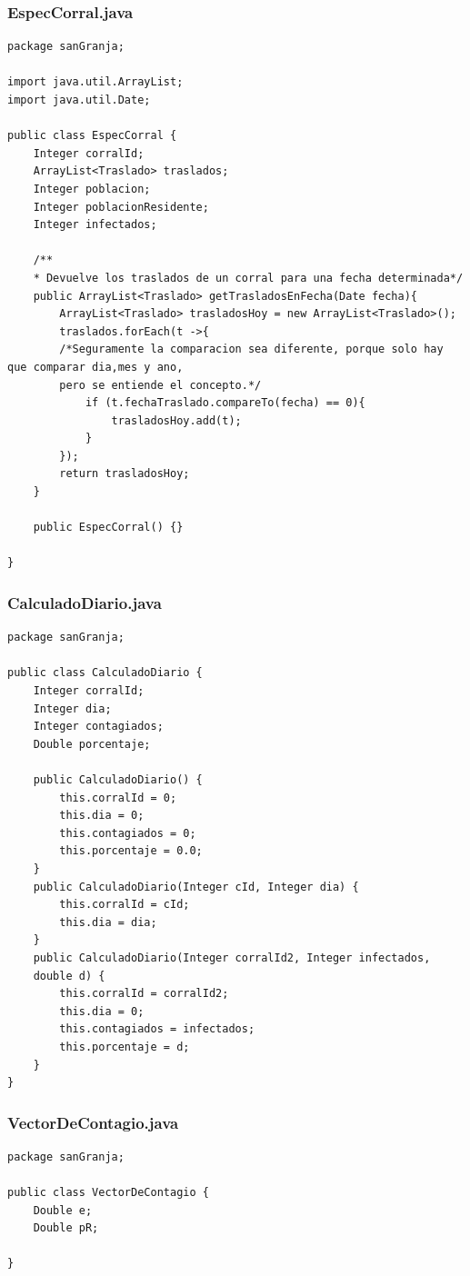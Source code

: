 \documentclass[a4paper]{article}
\begin{document}
\subsubsection{EspecCorral.java}
\begin{lstlisting}
package sanGranja;

import java.util.ArrayList;
import java.util.Date;

public class EspecCorral {
	Integer corralId;
	ArrayList<Traslado> traslados;
	Integer poblacion;
	Integer poblacionResidente;
	Integer infectados;
	
	/**
	* Devuelve los traslados de un corral para una fecha determinada*/
	public ArrayList<Traslado> getTrasladosEnFecha(Date fecha){
		ArrayList<Traslado> trasladosHoy = new ArrayList<Traslado>(); 
		traslados.forEach(t ->{
		/*Seguramente la comparacion sea diferente, porque solo hay que comparar dia,mes y ano, 
		pero se entiende el concepto.*/
			if (t.fechaTraslado.compareTo(fecha) == 0){
				trasladosHoy.add(t);
			}
		});
		return trasladosHoy;
	}	

	public EspecCorral() {}

}
\end{lstlisting}

\subsubsection{CalculadoDiario.java}
\begin{lstlisting}
package sanGranja;

public class CalculadoDiario {
	Integer corralId;
	Integer dia; 
	Integer contagiados;
	Double porcentaje;
	
	public CalculadoDiario() {
		this.corralId = 0;
		this.dia = 0;
		this.contagiados = 0;
		this.porcentaje = 0.0;
	}
	public CalculadoDiario(Integer cId, Integer dia) {
		this.corralId = cId;
		this.dia = dia;
	}
	public CalculadoDiario(Integer corralId2, Integer infectados,
	double d) {
		this.corralId = corralId2;
		this.dia = 0;
		this.contagiados = infectados;
		this.porcentaje = d;
	}
}
\end{lstlisting}


\subsubsection{VectorDeContagio.java}
\begin{lstlisting}
package sanGranja;

public class VectorDeContagio {
	Double e;
	Double pR;

}

\end{lstlisting}
\end{document}
